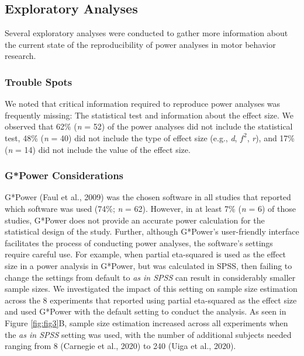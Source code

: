 \documentclass[
  doc, donotrepeattitle,floatsintext]{apa7}
\begin{document}
\clearpage

\hypertarget{exploratory-analyses}{%
\subsection{Exploratory Analyses}\label{exploratory-analyses}}

Several exploratory analyses were conducted to gather more information about the current state of the reproducibility of power analyses in motor behavior research.

\hypertarget{trouble-spots}{%
\subsubsection{Trouble Spots}\label{trouble-spots}}

We noted that critical information required to reproduce power analyses was frequently missing: The statistical test and information about the effect size. We observed that 62\% (\emph{n} = 52) of the power analyses did not include the statistical test, 48\% (\emph{n} = 40) did not include the type of effect size (e.g., \emph{d}, \(f^2\), \emph{r}), and 17\% (\emph{n} = 14) did not include the value of the effect size.

\hypertarget{gpower-considerations}{%
\subsubsection{G*Power Considerations}\label{gpower-considerations}}

G*Power (Faul et al., 2009) was the chosen software in all studies that reported which software was used (74\%; \emph{n} = 62). However, in at least 7\% (\emph{n} = 6) of those studies, G*Power does not provide an accurate power calculation for the statistical design of the study. Further, although G*Power's user-friendly interface facilitates the process of conducting power analyses, the software's settings require careful use. For example, when partial eta-squared is used as the effect size in a power analysis in G*Power, but was calculated in SPSS, then failing to change the settings from default to \emph{as in SPSS} can result in considerably smaller sample sizes. We investigated the impact of this setting on sample size estimation across the 8 experiments that reported using partial eta-squared as the effect size and used G*Power with the default setting to conduct the analysis. As seen in Figure \ref{fig:fig3}B, sample size estimation increased across all experiments when the \emph{as in SPSS} setting was used, with the number of additional subjects needed ranging from 8 (Carnegie et al., 2020) to 240 (Uiga et al., 2020).
\end{document}
